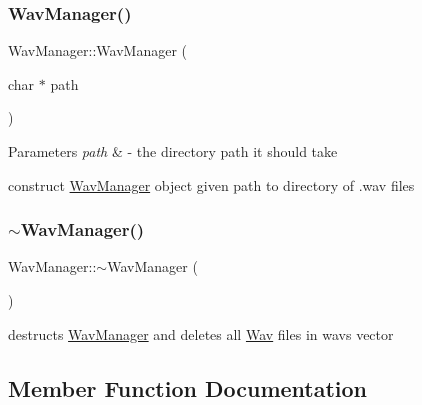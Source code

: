 \subsubsection{\texorpdfstring{Wav\+Manager()}{WavManager()}}
{\footnotesize\ttfamily Wav\+Manager\+::\+Wav\+Manager (\begin{DoxyParamCaption}\item[{char $\ast$}]{path }\end{DoxyParamCaption})}


\begin{DoxyParams}{Parameters}
{\em path} & -\/ the directory path it should take\\
\hline
\end{DoxyParams}

\begin{DoxyItemize}
\item construct \hyperlink{classWavManager}{Wav\+Manager} object given path to directory of .wav files 
\end{DoxyItemize}\mbox{\label{classWavManager_ada2c41fa0b1f388b3d90ade85fd21f6a}} 
\subsubsection{\texorpdfstring{$\sim$\+Wav\+Manager()}{~WavManager()}}
{\footnotesize\ttfamily Wav\+Manager\+::$\sim$\+Wav\+Manager (\begin{DoxyParamCaption}{ }\end{DoxyParamCaption})\hspace{0.3cm}{\ttfamily [virtual]}}


\begin{DoxyItemize}
\item destructs \hyperlink{classWavManager}{Wav\+Manager} and deletes all \hyperlink{classWav}{Wav} files in wavs vector 
\end{DoxyItemize}

\subsection{Member Function Documentation}
\mbox{\label{classWavManager_a505c8ecc7ae96bc5c6faad602ac26a6c}} 

